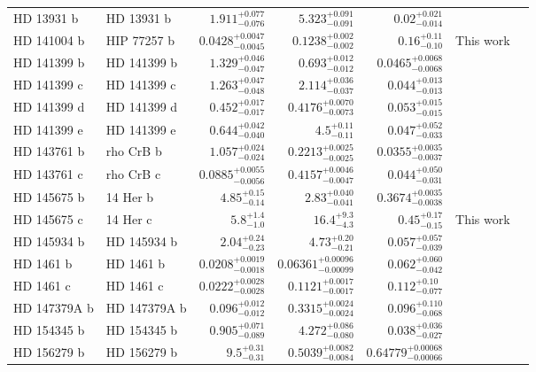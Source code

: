 \begin{longtable*}{llrrrrr}
HD 13931 b & HD 13931 b & $1.911^{+0.077}_{-0.076}$ & $5.323^{+0.091}_{-0.091}$ & $0.02^{+0.021}_{-0.014}$ & \cite{Howard10} & \\
HD 141004 b & HIP 77257 b & $0.0428^{+0.0047}_{-0.0045}$ & $0.1238^{+0.002}_{-0.002}$ & $0.16^{+0.11}_{-0.10}$ & This work & \\
HD 141399 b & HD 141399 b & $1.329^{+0.046}_{-0.047}$ & $0.693^{+0.012}_{-0.012}$ & $0.0465^{+0.0068}_{-0.0068}$ & \cite{Vogt14} & \\
HD 141399 c & HD 141399 c & $1.263^{+0.047}_{-0.048}$ & $2.114^{+0.036}_{-0.037}$ & $0.044^{+0.013}_{-0.013}$ & \cite{Vogt14} & \\
HD 141399 d & HD 141399 d & $0.452^{+0.017}_{-0.017}$ & $0.4176^{+0.0070}_{-0.0073}$ & $0.053^{+0.015}_{-0.015}$ & \cite{Vogt14} & \\
HD 141399 e & HD 141399 e & $0.644^{+0.042}_{-0.040}$ & $4.5^{+0.11}_{-0.11}$ & $0.047^{+0.052}_{-0.033}$ & \cite{Vogt14} & \\
HD 143761 b & rho CrB b & $1.057^{+0.024}_{-0.024}$ & $0.2213^{+0.0025}_{-0.0025}$ & $0.0355^{+0.0035}_{-0.0037}$ & \cite{Noyes97} & \\
HD 143761 c & rho CrB c & $0.0885^{+0.0055}_{-0.0056}$ & $0.4157^{+0.0046}_{-0.0047}$ & $0.044^{+0.050}_{-0.031}$ & \cite{Fulton16} & \\
HD 145675 b & 14 Her b & $4.85^{+0.15}_{-0.14}$ & $2.83^{+0.040}_{-0.041}$ & $0.3674^{+0.0035}_{-0.0038}$ & \cite{Wittenmyer07} & \\
HD 145675 c & 14 Her c & $5.8^{+1.4}_{-1.0}$ & $16.4^{+9.3}_{-4.3}$ & $0.45^{+0.17}_{-0.15}$ & This work & \\
HD 145934 b & HD 145934 b & $2.04^{+0.24}_{-0.23}$ & $4.73^{+0.20}_{-0.21}$ & $0.057^{+0.057}_{-0.039}$ & \cite{Feng15} & \\
HD 1461 b & HD 1461 b & $0.0208^{+0.0019}_{-0.0018}$ & $0.06361^{+0.00096}_{-0.00099}$ & $0.062^{+0.060}_{-0.042}$ & \cite{Rivera10} & \\
HD 1461 c & HD 1461 c & $0.0222^{+0.0028}_{-0.0028}$ & $0.1121^{+0.0017}_{-0.0017}$ & $0.112^{+0.10}_{-0.077}$ & \cite{Diaz16} & \\
HD 147379A b & HD 147379A b & $0.096^{+0.012}_{-0.012}$ & $0.3315^{+0.0024}_{-0.0024}$ & $0.096^{+0.110}_{-0.068}$ & \cite{Reiners18} & \\
HD 154345 b & HD 154345 b & $0.905^{+0.071}_{-0.089}$ & $4.272^{+0.086}_{-0.080}$ & $0.038^{+0.036}_{-0.027}$ & \cite{Wright08} & \\
HD 156279 b & HD 156279 b & $9.5^{+0.31}_{-0.31}$ & $0.5039^{+0.0082}_{-0.0084}$ & $0.64779^{+0.00068}_{-0.00066}$ & \cite{Diaz12} & \\

\end{longtable*}
